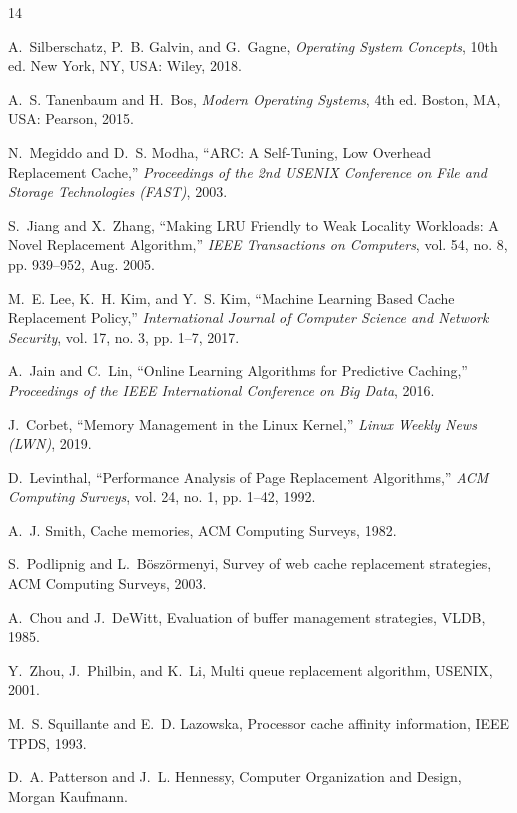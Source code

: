 \documentclass[conference]{IEEEtran}
\begin{document}
\begin{thebibliography}{14}

A.~Silberschatz, P.~B. Galvin, and G.~Gagne,
\emph{Operating System Concepts}, 10th ed.
New York, NY, USA: Wiley, 2018.

A.~S. Tanenbaum and H.~Bos,
\emph{Modern Operating Systems}, 4th ed.
Boston, MA, USA: Pearson, 2015.

N.~Megiddo and D.~S. Modha,
``ARC: A Self-Tuning, Low Overhead Replacement Cache,''
\emph{Proceedings of the 2nd USENIX Conference on File and Storage Technologies (FAST)}, 2003.

S.~Jiang and X.~Zhang,
``Making LRU Friendly to Weak Locality Workloads: A Novel Replacement Algorithm,''
\emph{IEEE Transactions on Computers}, vol. 54, no. 8, pp. 939--952, Aug. 2005.

M.~E. Lee, K.~H. Kim, and Y.~S. Kim,
``Machine Learning Based Cache Replacement Policy,''
\emph{International Journal of Computer Science and Network Security}, vol. 17, no. 3, pp. 1--7, 2017.

A.~Jain and C.~Lin,
``Online Learning Algorithms for Predictive Caching,''
\emph{Proceedings of the IEEE International Conference on Big Data}, 2016.

J.~Corbet,
``Memory Management in the Linux Kernel,''
\emph{Linux Weekly News (LWN)}, 2019.

D.~Levinthal,
``Performance Analysis of Page Replacement Algorithms,''
\emph{ACM Computing Surveys}, vol. 24, no. 1, pp. 1--42, 1992.

A.~J. Smith, Cache memories, ACM Computing Surveys, 1982.

S.~Podlipnig and L.~Böszörmenyi, Survey of web cache replacement strategies, ACM Computing Surveys, 2003.

A.~Chou and J.~DeWitt, Evaluation of buffer management strategies, VLDB, 1985.

Y.~Zhou, J.~Philbin, and K.~Li, Multi queue replacement algorithm, USENIX, 2001.

M.~S. Squillante and E.~D. Lazowska, Processor cache affinity information, IEEE TPDS, 1993.

D.~A. Patterson and J.~L. Hennessy, Computer Organization and Design, Morgan Kaufmann.

\end{thebibliography}
\end{document}

